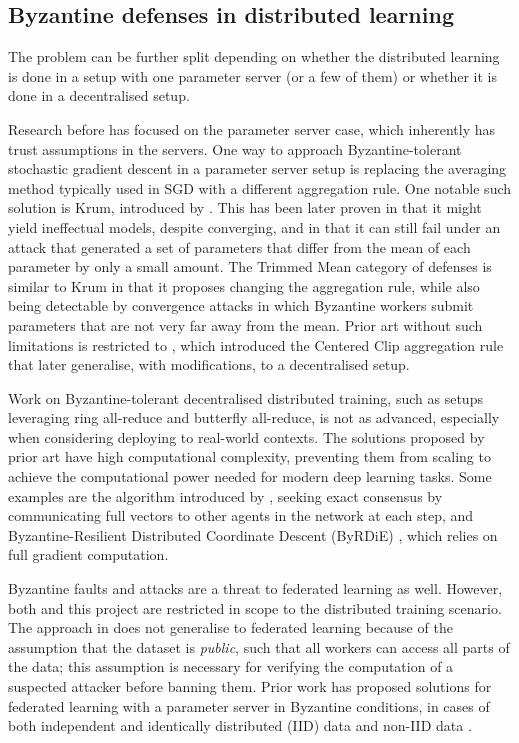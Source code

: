 \documentclass{article}
\begin{document}
\subsection{Byzantine defenses in distributed learning}
The problem can be further split depending on whether the distributed learning is done in a setup with one parameter server (or a few of them) or whether it is done in a decentralised setup.

Research before \cite{gorbunov2021secure} has focused on the parameter server case, which inherently has trust assumptions in the servers. One way to approach Byzantine-tolerant stochastic gradient descent in a parameter server setup is replacing the averaging method typically used in SGD with a different aggregation rule.
One notable such solution is Krum, introduced by \cite{blanchard2017machine}. This has been later proven in \cite{el2018hidden} that it might yield ineffectual models, despite converging, and in \cite{baruch2019little} that it can still fail under an attack that generated a set of parameters that differ from the mean of each parameter by only a small amount. The Trimmed Mean category of defenses \citep{xie2018generalized, yin2018byzantine} is similar to Krum in that it proposes changing the aggregation rule, while also being detectable by convergence attacks in which Byzantine workers submit parameters that are not very far away from the mean. Prior art without such limitations is restricted to \cite{karimireddy2021learning}, which introduced the Centered Clip aggregation rule that \cite{gorbunov2021secure} later generalise, with modifications, to a decentralised setup. 

Work on Byzantine-tolerant decentralised distributed training, such as setups leveraging ring all-reduce \citep{sergeev2018horovod} and butterfly all-reduce, is not as advanced, especially when considering deploying to real-world contexts. The solutions proposed by prior art have high computational complexity, preventing them from scaling to achieve the computational power needed for modern deep learning tasks. Some examples are the algorithm introduced by \cite{gupta2021byzantine}, seeking exact consensus by communicating full vectors to other agents in the network at each step, and Byzantine-Resilient Distributed Coordinate Descent (ByRDiE) \citep{yang2019byrdie}, which relies on full gradient computation. 

Byzantine faults and attacks are a threat to federated learning as well. However, both \cite{gorbunov2021secure} and this project are restricted in scope to the distributed training scenario. The approach in \cite{gorbunov2021secure} does not generalise to federated learning because of the assumption that the dataset is \textit{public}, such that all workers can access all parts of the data; this assumption is necessary for verifying the computation of a suspected attacker before banning them. Prior work has proposed solutions for federated learning with a parameter server in Byzantine conditions, in cases of both independent and identically distributed (IID) data \citep{chen2017distributed, blanchard2017machine} and non-IID data \citep{prakash2020mitigating}.
\end{document}
